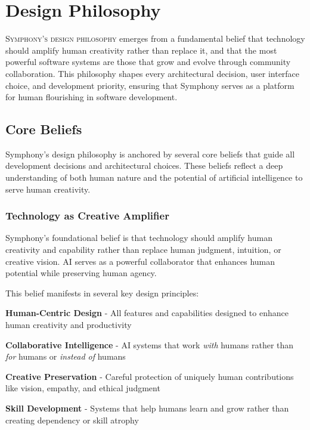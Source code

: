 
\section{Design Philosophy}
\label{sec:design-philosophy}

\lettrine{S}{ymphony's design philosophy} emerges from a fundamental belief that technology should amplify human creativity rather than replace it, and that the most powerful software systems are those that grow and evolve through community collaboration. This philosophy shapes every architectural decision, user interface choice, and development priority, ensuring that Symphony serves as a platform for human flourishing in software development.

\subsection{Core Beliefs}
\label{subsec:core-beliefs}

Symphony's design philosophy is anchored by several core beliefs that guide all development decisions and architectural choices. These beliefs reflect a deep understanding of both human nature and the potential of artificial intelligence to serve human creativity.

\subsubsection{Technology as Creative Amplifier}

\begin{infobox}[title={Fundamental Belief: Amplify, Don't Replace}]
Symphony's foundational belief is that technology should amplify human creativity and capability rather than replace human judgment, intuition, or creative vision. AI serves as a powerful collaborator that enhances human potential while preserving human agency.
\end{infobox}

This belief manifests in several key design principles:

\begin{expandedlist}
    \item \textbf{Human-Centric Design} - All features and capabilities designed to enhance human creativity and productivity
    
    \item \textbf{Collaborative Intelligence} - AI systems that work \textit{with} humans rather than \textit{for} humans or \textit{instead of} humans
    
    \item \textbf{Creative Preservation} - Careful protection of uniquely human contributions like vision, empathy, and ethical judgment
    
    \item \textbf{Skill Development} - Systems that help humans learn and grow rather than creating dependency or skill atrophy
\end{expandedlist}

